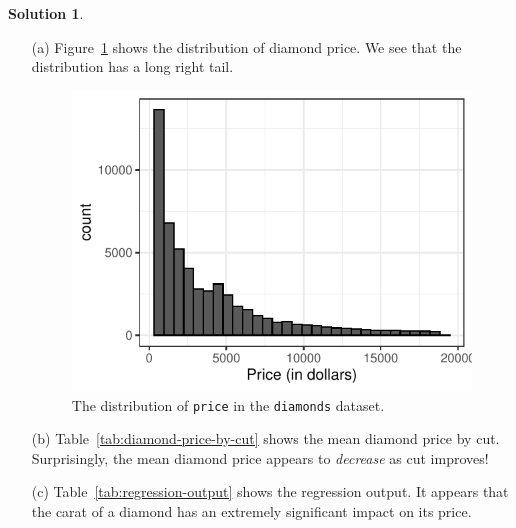 \documentclass[11pt,letterpaper,english,oneside]{article} %
\theoremstyle{definition} %
\newtheorem{solution}{Solution}
\newenvironment{sol}{\begin{solution}\hspace{0pt}}{\end{solution}}
\begin{document}
\begin{sol}

\begin{enumerate}
  \item[(a)] Figure~\ref{fig:price-hist} shows the distribution of diamond price. We see that the distribution has a long right tail.
  
  \begin{figure}[h!]
    \centering
    \includegraphics{figures-and-tables/price-histogram.pdf}
    \caption{The distribution of \texttt{price} in the \texttt{diamonds} dataset.}
    \label{fig:price-hist}
  \end{figure}

  \item[(b)] Table~\ref{tab:diamond-price-by-cut} shows the mean diamond price by cut. Surprisingly, the mean diamond price appears to \textit{decrease} as cut improves!
  

  \item[(c)] Table~\ref{tab:regression-output} shows the regression output. It appears that the carat of a diamond has an extremely significant impact on its price.
  
  
\end{enumerate}
    

\end{sol}
\end{document}
